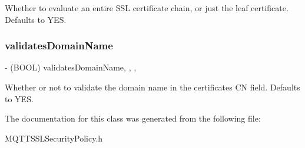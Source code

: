 Whether to evaluate an entire S\+SL certificate chain, or just the leaf certificate. Defaults to {\ttfamily Y\+ES}. \mbox{\label{interface_m_q_t_t_s_s_l_security_policy_a905b5b1a0d5498ed11d36b9ca60514fc}} 
\subsubsection{\texorpdfstring{validates\+Domain\+Name}{validatesDomainName}}
{\footnotesize\ttfamily -\/ (B\+O\+OL) validates\+Domain\+Name\hspace{0.3cm}{\ttfamily [read]}, {\ttfamily [write]}, {\ttfamily [nonatomic]}, {\ttfamily [assign]}}

Whether or not to validate the domain name in the certificate\textquotesingle{}s CN field. Defaults to {\ttfamily Y\+ES}. 

The documentation for this class was generated from the following file\+:\begin{DoxyCompactItemize}
\item 
M\+Q\+T\+T\+S\+S\+L\+Security\+Policy.\+h\end{DoxyCompactItemize}
